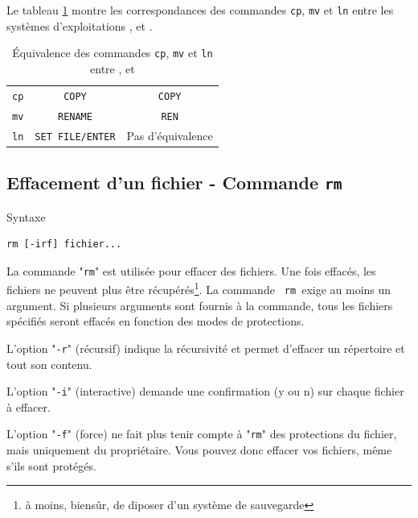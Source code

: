 Le tableau \ref{tab-cmds-equiv-mvcpln} montre les correspondances des commandes
{\tt cp}, {\tt mv} et {\tt ln} entre les syst{\`e}mes d'exploitations {\Unix},
{\OpenVMS} et {\DOS}.

\begin{table}[hbtp]
\centering
\begin{tabular}{|c|c|c|}
	\hline
		{\Unix}		&	{\OpenVMS}	&	{\DOS}					\\
	\hline \hline
		{\tt cp}		&	{\tt COPY}		&	{\tt COPY}				\\
		{\tt mv}		&	{\tt RENAME}	&	{\tt REN}	\\
		{\tt ln}		&	{\tt SET FILE/ENTER} 	&	Pas d'{\'e}quivalence	\\
	\hline
\end{tabular}
\caption{\label{tab-cmds-equiv-mvcpln}\'{E}quivalence des commandes {\tt cp},
{\tt mv} et {\tt ln} entre {\Unix},{\OpenVMS} et {\DOS}}
\end{table}

\subsection{Effacement d'un fichier - Commande {\tt rm}}

\begin{definition}{Syntaxe}
\begin{verbatim}
rm [-irf] fichier...
\end{verbatim}
\end{definition}

La commande "{\tt rm}" est utilis{\'e}e pour effacer des fichiers. Une
fois effac{\'e}s, les fichiers ne peuvent plus {\^e}tre r{\'e}cup{\'e}r{\'e}s\footnote{{\`a}
moins, biens{\^u}r, de diposer d'un syst{\`e}me de sauvegarde}. La commande {\tt
rm }exige au moins un argument. Si plusieurs arguments sont fournis {\`a} la
commande, tous les fichiers sp{\'e}cifi{\'e}s seront effac{\'e}s en fonction des
modes de protections.

L'option "{\tt -r}" (r{\'e}cursif) indique la r{\'e}cursivit{\'e} et permet d'effacer un r{\'e}pertoire et tout son contenu.

L'option "{\tt -i}" (interactive) demande une confirmation (y ou n) sur chaque fichier {\`a} effacer.

L'option "{\tt -f}" (force) ne fait plus tenir compte {\`a} "{\tt rm}" des protections du fichier, mais uniquement du
propri{\'e}taire. Vous pouvez donc effacer vos fichiers, m{\^e}me s'ils sont prot{\'e}g{\'e}s.

